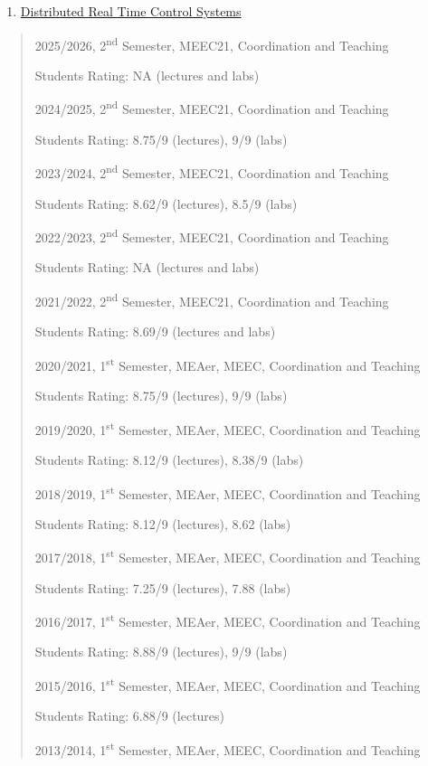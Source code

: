 \begin{enumerate}
\def\labelenumi{\arabic{enumi}.}
\setcounter{enumi}{1}
\item
  \ul{Distributed Real Time Control Systems}
\end{enumerate}
\begin{quote}
2025/2026, 2\textsuperscript{nd} Semester, MEEC21, Coordination and
Teaching

Students Rating: NA (lectures and labs)

2024/2025, 2\textsuperscript{nd} Semester, MEEC21, Coordination and
Teaching

Students Rating: 8.75/9 (lectures), 9/9 (labs)

2023/2024, 2\textsuperscript{nd} Semester, MEEC21, Coordination and
Teaching

Students Rating: 8.62/9 (lectures), 8.5/9 (labs)

2022/2023, 2\textsuperscript{nd} Semester, MEEC21, Coordination and
Teaching

Students Rating: NA (lectures and labs)


2021/2022, 2\textsuperscript{nd} Semester, MEEC21, Coordination and
Teaching

Students Rating: 8.69/9 (lectures and labs)

2020/2021, 1\textsuperscript{st} Semester, MEAer, MEEC, Coordination and
Teaching

Students Rating: 8.75/9 (lectures), 9/9 (labs)

2019/2020, 1\textsuperscript{st} Semester, MEAer, MEEC, Coordination and
Teaching

Students Rating: 8.12/9 (lectures), 8.38/9 (labs)

2018/2019, 1\textsuperscript{st} Semester, MEAer, MEEC, Coordination and
Teaching

Students Rating: 8.12/9 (lectures), 8.62 (labs)

2017/2018, 1\textsuperscript{st} Semester, MEAer, MEEC, Coordination and
Teaching

Students Rating: 7.25/9 (lectures), 7.88 (labs)

2016/2017, 1\textsuperscript{st} Semester, MEAer, MEEC, Coordination and
Teaching

Students Rating: 8.88/9 (lectures), 9/9 (labs)

2015/2016, 1\textsuperscript{st} Semester, MEAer, MEEC, Coordination and
Teaching

Students Rating: 6.88/9 (lectures)

2013/2014, 1\textsuperscript{st} Semester, MEAer, MEEC, Coordination and
Teaching


\end{quote}
